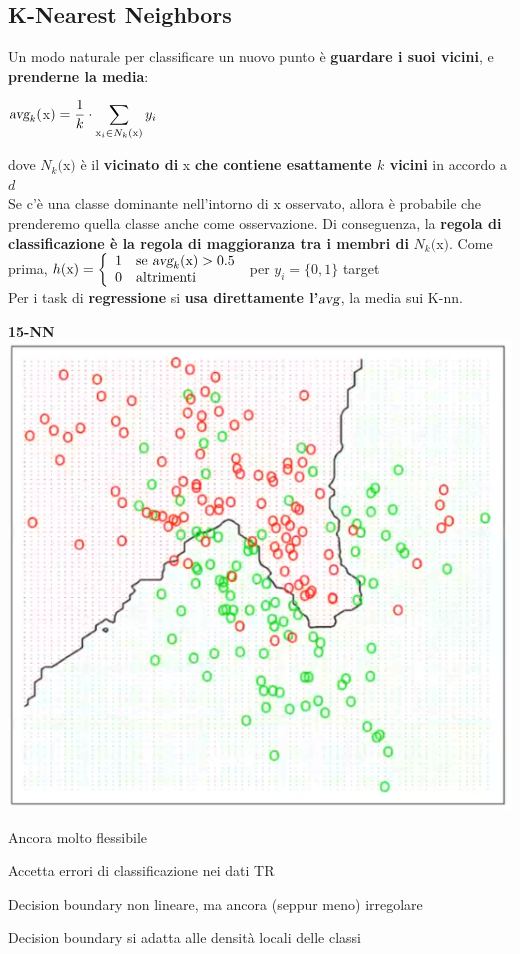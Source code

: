 \documentclass[10pt]{book}
\begin{document}
\subsection{K-Nearest Neighbors}
Un modo naturale per classificare un nuovo punto è \textbf{guardare i suoi vicini}, e \textbf{prenderne la media}:
\begin{list}{}{}
	\item $\textsl{avg}_k($x$) = \mathlarger{\frac{1}{k}\cdot\sum_{\text{x}_i\in N_k(\text{x})}y_i}$
\end{list}
dove $N_k($x$)$ è il \textbf{vicinato di} x \textbf{che contiene esattamente $k$ vicini} in accordo a $d$\\
Se c'è una classe dominante nell'intorno di x osservato, allora è probabile che prenderemo quella classe anche come osservazione. Di conseguenza, la \textbf{regola di classificazione è la regola di maggioranza tra i membri di} $N_k($x$)$. Come prima, $h(\text{x}) = \left\{\begin{array}{l l}
1 & \text{se }\textsl{avg}_k(\text{x}) > 0.5\\
0 & \text{altrimenti}
\end{array} \right.$ per $y_i=\{0, 1\}$ target\\
Per i task di \textbf{regressione} si \textbf{usa direttamente l'$\textsl{avg}$}, la media sui K-nn.
\begin{multicols}{2}
\begin{center}
	\textbf{15-NN}\\
	\includegraphics[scale=0.65]{ml15nn.png}
\end{center}
\begin{list}{}{}
	\item Ancora molto flessibile
	\item Accetta errori di classificazione nei dati TR
	\item Decision boundary non lineare, ma ancora (seppur meno) irregolare
	\item Decision boundary si adatta alle densità locali delle classi
\end{list}
\end{multicols}
\end{document}
